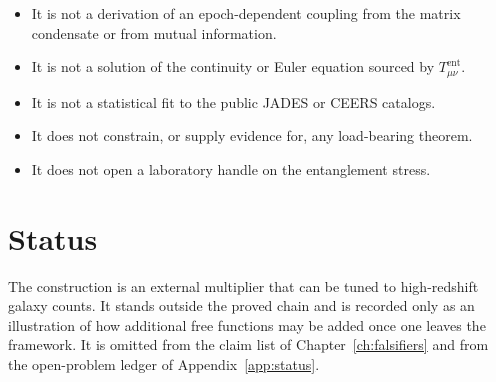 \begin{itemize}
  \item It is not a derivation of an epoch-dependent coupling from
        the matrix condensate or from mutual information.
  \item It is not a solution of the continuity or Euler equation
        sourced by \(T_{\mu\nu}^{\mathrm{ent}}\).
  \item It is not a statistical fit to the public JADES or CEERS
        catalogs.
  \item It does not constrain, or supply evidence for, any
        load-bearing theorem.
  \item It does not open a laboratory handle on the entanglement
        stress.
\end{itemize}

\section{Status}
\label{sec:pheno-status}

The construction is an external multiplier that can be tuned to
high-redshift galaxy counts. It stands outside the proved chain
and is recorded only as an illustration of how additional free
functions may be added once one leaves the framework. It is omitted
from the claim list of Chapter~\ref{ch:falsifiers} and from the
open-problem ledger of Appendix~\ref{app:status}.